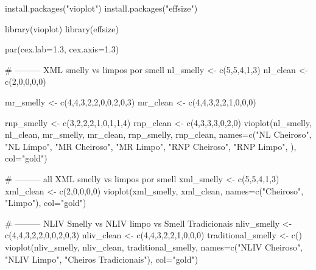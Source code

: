 







install.packages("vioplot")
install.packages("effsize")

library(vioplot)
library(effsize)
 
par(cex.lab=1.3, cex.axis=1.3)

# --------- XML smelly vs limpos por smell
nl_smelly <- c(5,5,4,1,3)
nl_clean <- c(2,0,0,0,0)

mr_smelly <- c(4,4,3,2,2,0,0,2,0,3)
mr_clean <- c(4,4,3,2,2,1,0,0,0)

rnp_smelly <- c(3,2,2,2,1,0,1,1,4)
rnp_clean <- c(4,3,3,3,0,2,0)
vioplot(nl_smelly, nl_clean, mr_smelly, mr_clean, rnp_smelly, rnp_clean,
        names=c("NL Cheiroso", "NL Limpo", "MR Cheiroso", "MR Limpo", "RNP Cheiroso", "RNP Limpo", ), col="gold")


# --------- all XML smelly vs limpos por smell
xml_smelly <- c(5,5,4,1,3)
xml_clean <- c(2,0,0,0,0)
vioplot(xml_smelly, xml_clean, names=c("Cheiroso", "Limpo"), col="gold")


# --------- NLIV Smelly vs NLIV limpo vs Smell Tradicionais
nliv_smelly <- c(4,4,3,2,2,0,0,2,0,3)
nliv_clean <- c(4,4,3,2,2,1,0,0,0)
traditional_smelly <- c()
vioplot(nliv_smelly, nliv_clean, traditional_smelly, names=c("NLIV Cheiroso", "NLIV Limpo", "Cheiros Tradicionais"), col="gold")


